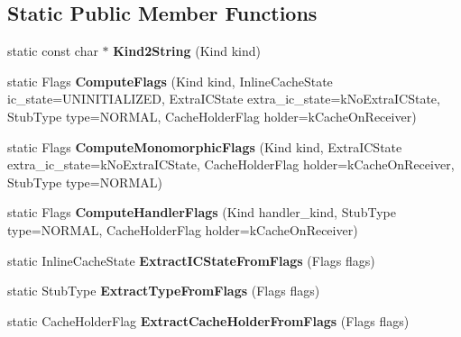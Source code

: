 \subsection*{Static Public Member Functions}
\begin{DoxyCompactItemize}
\item 
\hypertarget{classv8_1_1internal_1_1_code_a4f341eb1728094338978e676ba787bac}{}static const char $\ast$ {\bfseries Kind2\+String} (Kind kind)\label{classv8_1_1internal_1_1_code_a4f341eb1728094338978e676ba787bac}

\item 
\hypertarget{classv8_1_1internal_1_1_code_a4cce7152c487fca7d248619a9af794a6}{}static Flags {\bfseries Compute\+Flags} (Kind kind, Inline\+Cache\+State ic\+\_\+state=U\+N\+I\+N\+I\+T\+I\+A\+L\+I\+Z\+E\+D, Extra\+I\+C\+State extra\+\_\+ic\+\_\+state=k\+No\+Extra\+I\+C\+State, Stub\+Type type=N\+O\+R\+M\+A\+L, Cache\+Holder\+Flag holder=k\+Cache\+On\+Receiver)\label{classv8_1_1internal_1_1_code_a4cce7152c487fca7d248619a9af794a6}

\item 
\hypertarget{classv8_1_1internal_1_1_code_ae10e7544fbfc8b6b96b4e957a0c37fcf}{}static Flags {\bfseries Compute\+Monomorphic\+Flags} (Kind kind, Extra\+I\+C\+State extra\+\_\+ic\+\_\+state=k\+No\+Extra\+I\+C\+State, Cache\+Holder\+Flag holder=k\+Cache\+On\+Receiver, Stub\+Type type=N\+O\+R\+M\+A\+L)\label{classv8_1_1internal_1_1_code_ae10e7544fbfc8b6b96b4e957a0c37fcf}

\item 
\hypertarget{classv8_1_1internal_1_1_code_a1f9cf9be67fec5092b512a5934a7ebcf}{}static Flags {\bfseries Compute\+Handler\+Flags} (Kind handler\+\_\+kind, Stub\+Type type=N\+O\+R\+M\+A\+L, Cache\+Holder\+Flag holder=k\+Cache\+On\+Receiver)\label{classv8_1_1internal_1_1_code_a1f9cf9be67fec5092b512a5934a7ebcf}

\item 
\hypertarget{classv8_1_1internal_1_1_code_a9f3e7c286012b8719d4a105c35a22a5e}{}static Inline\+Cache\+State {\bfseries Extract\+I\+C\+State\+From\+Flags} (Flags flags)\label{classv8_1_1internal_1_1_code_a9f3e7c286012b8719d4a105c35a22a5e}

\item 
\hypertarget{classv8_1_1internal_1_1_code_a3e1dd33679c8b76d50c8b57a759d4c53}{}static Stub\+Type {\bfseries Extract\+Type\+From\+Flags} (Flags flags)\label{classv8_1_1internal_1_1_code_a3e1dd33679c8b76d50c8b57a759d4c53}

\item 
\hypertarget{classv8_1_1internal_1_1_code_ac2f8f96d02753c6c2a84afd8fe8c2639}{}static Cache\+Holder\+Flag {\bfseries Extract\+Cache\+Holder\+From\+Flags} (Flags flags)\label{classv8_1_1internal_1_1_code_ac2f8f96d02753c6c2a84afd8fe8c2639}


\end{DoxyCompactItemize}
